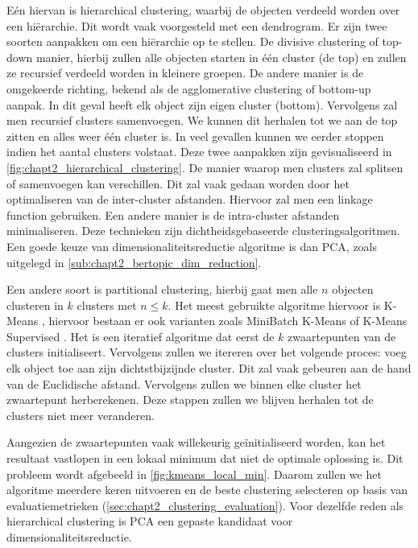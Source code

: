 Eén hiervan is hierarchical clustering, waarbij de objecten verdeeld worden over een hiërarchie. Dit wordt vaak voorgesteld met een dendrogram. Er zijn twee soorten aanpakken om een hiërarchie op te stellen. De divisive clustering of top-down manier, hierbij zullen alle objecten starten in één cluster (de top) en zullen ze recursief verdeeld worden in kleinere groepen. De andere manier is de omgekeerde richting, bekend als de agglomerative clustering of bottom-up aanpak. In dit geval heeft elk object zijn eigen cluster (bottom). Vervolgens zal men recursief clusters samenvoegen. We kunnen dit herhalen tot we aan de top zitten en alles weer één cluster is. In veel gevallen kunnen we eerder stoppen indien het aantal clusters volstaat. Deze twee aanpakken zijn gevisualiseerd in \autoref{fig:chapt2_hierarchical_clustering}. 
\newline
De manier waarop men clusters zal splitsen of samenvoegen kan verschillen. Dit zal vaak gedaan worden door het optimaliseren van de inter-cluster afstanden. Hiervoor zal men een linkage function gebruiken. Een andere manier is de intra-cluster afstanden minimaliseren. Deze technieken zijn dichtheidsgebaseerde clusteringsalgoritmen. Een goede keuze van dimensionaliteitsreductie algoritme is dan PCA, zoals uitgelegd in \autoref{sub:chapt2_bertopic_dim_reduction}.


Een andere soort is partitional clustering, hierbij gaat men alle $n$ objecten clusteren in $k$ clusters met $ n \leq k $. Het meest gebruikte algoritme hiervoor is K-Means \cite{kmeans_wiki}, hiervoor bestaan er ook varianten zoals MiniBatch K-Means \cite{kmeans_minibatch} of K-Means Supervised \cite{kmeans_supervised}. Het is een iteratief algoritme dat eerst de $k$ zwaartepunten van de clusters initialiseert. Vervolgens zullen we itereren over het volgende proces: voeg elk object toe aan zijn dichtstbijzijnde cluster. Dit zal vaak gebeuren aan de hand van de Euclidische afstand. Vervolgens zullen we binnen elke cluster het zwaartepunt herberekenen. Deze stappen zullen we blijven herhalen tot de clusters niet meer veranderen.

Aangezien de zwaartepunten vaak willekeurig geïnitialiseerd worden, kan het resultaat vastlopen in een lokaal minimum dat niet de optimale oplossing is. Dit probleem wordt afgebeeld in \autoref{fig:kmeans_local_min}. Daarom zullen we het algoritme meerdere keren uitvoeren en de beste clustering selecteren op basis van evaluatiemetrieken (\autoref{sec:chapt2_clustering_evaluation}). Voor dezelfde reden als hierarchical clustering is PCA een gepaste kandidaat voor dimensionaliteitsreductie.

